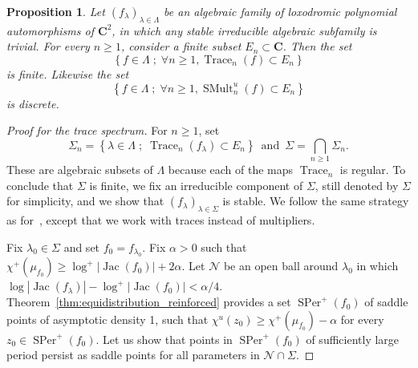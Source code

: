 \documentclass[oneside, 12pt]{amsart}
\newcommand{\set}[1]{\left\{#1\right\}}
\newcommand{\abs}[1]{\left\vert#1\right\vert}
\DeclareMathOperator{\jac}{Jac}
\DeclareMathOperator{\SPer}{SPer}
\DeclareMathOperator{\Trace}{Trace}
\DeclareMathOperator{\SMult}{SMult}
\newcommand{\C}{\mathbf{C}}
\theoremstyle{plain}
\newtheorem{pro}[thm]{Proposition}
\theoremstyle{definition}
\numberwithin{equation}{section}       %
\numberwithin{equation}{section}       %
\begin{document}
\begin{pro}
\label{pro:multipliers}
Let $(f_\lambda)_{\lambda\in \Lambda}$ be an algebraic family of loxodromic 
polynomial automorphisms of $\C^2$, in which any stable irreducible 
algebraic subfamily  
 is trivial.  For every $n\geq 1$, consider a finite subset $E_n\subset \C$. Then the set
   $$\set{f\in \Lambda \; ; \;  \forall n\geq 1, \Trace_n(f) \subset E_n} $$ is finite. Likewise  the set 
$$\set{f\in \Lambda \; ; \; \forall n\geq 1, \SMult^u_n(f) \subset E_n}$$ is discrete. 
\end{pro}

 

\begin{proof}[Proof for the trace spectrum]
For $n\geq 1$, set 
\begin{equation}
\Sigma_n =   \set{\lambda \in \Lambda \; ; \;  \Trace_n(f_\lambda) \subset E_n} \, \text{ and } \, 
\Sigma = \bigcap_{n\geq 1} \Sigma_n. 
\end{equation}
These are algebraic subsets of $\Lambda$ because each of the maps $\Trace_n$ is regular.
To conclude that $\Sigma$ is finite, we fix an irreducible component of $\Sigma$, still denoted by $\Sigma$ for simplicity, and we show that $(f_\lambda)_{\lambda\in \Sigma}$  is  stable. 
We follow the same strategy as for~\cite[Lem. 8.5]{rigidity}, 
except that we work with traces instead of multipliers. %

Fix $\lambda_0\in\Sigma$ and set $f_0 = f_{\lambda_0}$. Fix $\alpha>0$   such that $\chi^+(\mu_{f_0})\geq \log^+\abs{\jac(f_0)}+2\alpha$. Let $\mathcal N$ be an open  ball
around $\lambda_0$ in which $ \log \abs{\jac(f_\lambda)}   - \log^+\abs{\jac(f_0)} < \alpha/4$.
Theorem~\ref{thm:equidistribution_reinforced} provides
a  set $\SPer^+(f_0)$ of  saddle points  of asymptotic density 1, such that $\chi^u(z_0)\geq \chi^+(\mu_{f_0}) - \alpha$ for 
every $z_0\in \SPer^+(f_0)$.  
Let us show  that points in 
$\SPer^+(f_0)$ of sufficiently large   period 
persist as saddle points for all parameters in $\mathcal N\cap \Sigma$. 


\end{proof}
\end{document}
